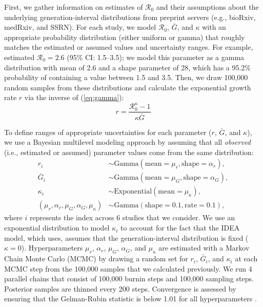 \documentclass[12pt]{article}
\newcommand{\eref}[1]{(\ref{eq:#1})}
\begin{document}
First, we gather information on estimates of $\mathcal R_0$ and their
assumptions about the underlying generation-interval distributions from preprint servers (e.g., bioRxiv, medRxiv, and SSRN).
For each study, we model $\mathcal R_0$, $\bar G$, and $\kappa$ with an appropriate probability distribution (either uniform or gamma) that roughly matches the estimated or assumed values and uncertainty ranges.
For example, \cite{imaincov} estimated $\mathcal R_0 = 2.6$ (95\% CI: 1.5--3.5);
we model this parameter as a gamma distribution with mean of 2.6 and a shape parameter of 28, which has a 95.2\% probability of containing a value between 1.5 and 3.5.
Then, we draw 100,000 random samples from these distributions and calculate the exponential growth rate $r$ via the inverse of \eref{gamma}:
\begin{equation}
r = \frac{\mathcal R_0^\kappa - 1}{\kappa \bar{G}}
\end{equation}

To define ranges of appropriate uncertainties for each parameter ($r$, $\bar G$, and $\kappa$),
we use a Bayesian multilevel modeling approach by assuming that all \emph{observed} (i.e., estimated or assumed) parameter values come from the same distribution:
\begin{equation}
\begin{aligned}
r_i &\sim \mathrm{Gamma}(\mathrm{mean}=\mu_r, \mathrm{shape}=\alpha_r),\\
\bar{G}_i &\sim \mathrm{Gamma}(\mathrm{mean}=\mu_G, \mathrm{shape}=\alpha_G),\\
\kappa_i &\sim \mathrm{Exponential}(\mathrm{mean}=\mu_\kappa),\\
(\mu_r, \alpha_r, \mu_G, \alpha_G, \mu_\kappa) &\sim \mathrm{Gamma}(\mathrm{shape}=0.1, \mathrm{rate}=0.1),
\end{aligned}
\end{equation}
where $i$ represents the index across 6 studies that we consider.
We use an exponential distribution to model $\kappa_i$ to account for the fact that the IDEA model, which \cite{majumderncov} uses, assumes that the generation-interval distribution is fixed ($\kappa = 0$).
Hyperparameters $\mu_r$, $\alpha_r$, $\mu_G$, $\alpha_G$, and $\mu_\kappa$ are estimated with a Markov Chain Monte Carlo (MCMC) by drawing a random set for $r_i$, $\bar{G}_i$, and $\kappa_i$ at each MCMC step from the 100,000 samples that we calculated previously.
We run 4 parallel chains that consist of 100,000 burnin steps and 100,000 sampling steps.
Posterior samples are thinned every 200 steps.
Convergence is assessed by ensuring that the Gelman-Rubin statistic is below 1.01 for all hyperparameters \citep{gelman1992inference}.





\pagebreak


\end{document}

